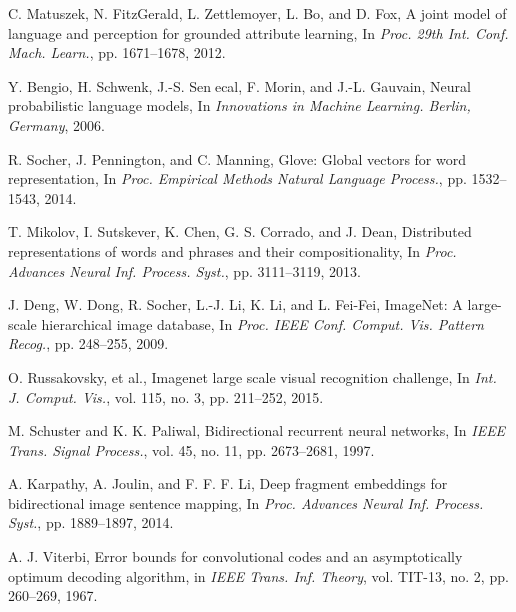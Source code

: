 \documentclass[10pt,twocolumn,letterpaper]{article}
\begin{document}
\begin{thebibliography}{99}
C. Matuszek, N. FitzGerald, L. Zettlemoyer, L. Bo, and D. Fox, A joint model of language and perception for grounded attribute learning,
In \textit{Proc. 29th Int. Conf. Mach. Learn.}, pp. 1671–1678, 2012.

Y. Bengio, H. Schwenk, J.-S. Senecal, F. Morin, and J.-L. Gauvain, Neural probabilistic language models,
In \textit{Innovations in Machine Learning. Berlin, Germany}, 2006.

R. Socher, J. Pennington, and C. Manning, Glove: Global vectors for word representation,
In \textit{Proc. Empirical Methods Natural Language Process.}, pp. 1532–1543, 2014.

T. Mikolov, I. Sutskever, K. Chen, G. S. Corrado, and J. Dean, Distributed representations of words and phrases and their compositionality,
In \textit{Proc. Advances Neural Inf. Process. Syst.}, pp. 3111–3119, 2013.

J. Deng, W. Dong, R. Socher, L.-J. Li, K. Li, and L. Fei-Fei, ImageNet: A large-scale hierarchical image database,
In \textit{Proc. IEEE Conf. Comput. Vis. Pattern Recog.}, pp. 248–255, 2009.

O. Russakovsky, et al., Imagenet large scale visual recognition challenge,
In \textit{Int. J. Comput. Vis.}, vol. 115, no. 3, pp. 211–252, 2015.

M. Schuster and K. K. Paliwal, Bidirectional recurrent neural networks,
In \textit{IEEE Trans. Signal Process.}, vol. 45, no. 11, pp. 2673–2681, 1997.

A. Karpathy, A. Joulin, and F. F. F. Li, Deep fragment embeddings for bidirectional image sentence mapping,
In \textit{Proc. Advances Neural Inf. Process. Syst.}, pp. 1889–1897, 2014.

A. J. Viterbi, Error bounds for convolutional codes and an asymptotically optimum decoding algorithm,
in \textit{IEEE Trans. Inf. Theory}, vol. TIT-13, no. 2, pp. 260–269, 1967.

\end{thebibliography}
\end{document}
